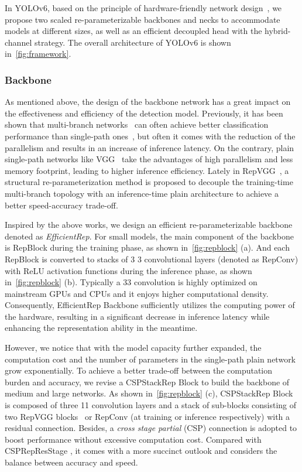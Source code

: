 \documentclass[10pt,twocolumn,letterpaper]{article}
\begin{document}
  In YOLOv6, based on the principle of hardware-friendly network design~\cite{ding2021repvgg}, we propose two scaled re-parameterizable backbones and necks to accommodate models at different sizes, as well as an efficient decoupled head with the hybrid-channel strategy. The overall architecture of YOLOv6 is shown in~\cref{fig:framework}. 

\subsubsection{Backbone}
\label{sec:method:backbone}
As mentioned above, the design of the backbone network has a great impact on the effectiveness and efficiency of the detection model. Previously, it has been shown that multi-branch networks~\cite{szegedy2015going,szegedy2016rethinking,he2016identity,huang2017densely} can often achieve better classification performance than single-path ones~\cite{krizhevsky2012imagenet, simonyan2014very}, but often it comes with the reduction of the parallelism and results in an increase of inference latency. On the contrary, plain single-path networks like VGG~\cite{simonyan2014very} take the advantages of high parallelism and less memory footprint, leading to higher inference efficiency. Lately in RepVGG~\cite{ding2021repvgg}, a structural re-parameterization method is proposed to decouple the training-time multi-branch topology with an inference-time plain architecture to achieve a better speed-accuracy trade-off. 

Inspired by the above works, we design an efficient re-parameterizable backbone denoted as \emph{EfficientRep}. For small models, the main component of the backbone is RepBlock during the training phase, as shown in~\cref{fig:repblock} (a). And each RepBlock is converted to stacks of 3  3 convolutional layers (denoted as RepConv) with ReLU activation functions during the inference phase, as shown in~\cref{fig:repblock} (b). Typically a 33 convolution is highly optimized on mainstream GPUs and CPUs and it enjoys higher computational density. Consequently, EfficientRep Backbone sufficiently utilizes the computing power of the hardware, resulting in a significant decrease in inference latency while enhancing the representation ability in the meantime.

However, we notice that with the model capacity further expanded, the computation cost and the number of parameters in the single-path plain network grow exponentially. To achieve a better trade-off between the computation burden and accuracy, we revise a CSPStackRep Block to build the backbone of medium and large networks. As shown in~\cref{fig:repblock} (c), CSPStackRep Block is composed of three 11 convolution layers and a stack of sub-blocks consisting of two RepVGG blocks~\cite{ding2021repvgg} or RepConv (at training or inference respectively) with a residual connection. Besides, a \emph{cross stage partial} (CSP) connection is adopted to boost performance without excessive computation cost. Compared with CSPRepResStage \cite{xu2022ppyoloe}, it comes with a more succinct outlook and considers the balance between accuracy and speed.
\end{document}
